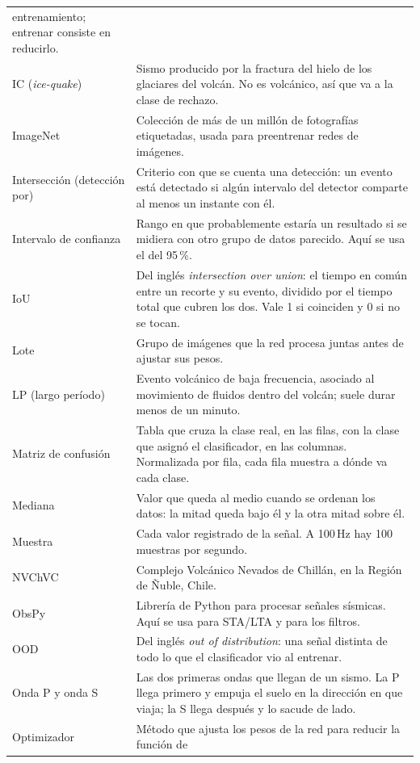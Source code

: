 {\begin{longtable}{>{\raggedright\arraybackslash}p{3.4cm}>{\raggedright\arraybackslash}p{9.4cm}}
entrenamiento; entrenar consiste en reducirlo. \\
IC (\emph{ice-quake}) & Sismo producido por la fractura del hielo de los
glaciares del volcán. No es volcánico, así que va a la clase de rechazo. \\
ImageNet & Colección de más de un millón de fotografías etiquetadas, usada para
preentrenar redes de imágenes. \\
Intersección (detección por) & Criterio con que se cuenta una detección: un
evento está detectado si algún intervalo del detector comparte al menos un
instante con él. \\
Intervalo de confianza & Rango en que probablemente estaría un resultado si se
midiera con otro grupo de datos parecido. Aquí se usa el del 95\,\%. \\
IoU & Del inglés \emph{intersection over union}: el tiempo en común entre un
recorte y su evento, dividido por el tiempo total que cubren los dos. Vale 1
si coinciden y 0 si no se tocan. \\
Lote & Grupo de imágenes que la red procesa juntas antes de ajustar sus
pesos. \\
LP (largo período) & Evento volcánico de baja frecuencia, asociado al
movimiento de fluidos dentro del volcán; suele durar menos de un minuto. \\
Matriz de confusión & Tabla que cruza la clase real, en las filas, con la
clase que asignó el clasificador, en las columnas. Normalizada por fila, cada
fila muestra a dónde va cada clase. \\
Mediana & Valor que queda al medio cuando se ordenan los datos: la mitad queda
bajo él y la otra mitad sobre él. \\
Muestra & Cada valor registrado de la señal. A 100\,Hz hay 100 muestras por
segundo. \\
NVChVC & Complejo Volcánico Nevados de Chillán, en la Región de Ñuble,
Chile. \\
ObsPy & Librería de Python para procesar señales sísmicas. Aquí se usa para
STA/LTA y para los filtros. \\
OOD & Del inglés \emph{out of distribution}: una señal distinta de todo lo que
el clasificador vio al entrenar. \\
Onda P y onda S & Las dos primeras ondas que llegan de un sismo. La P llega
primero y empuja el suelo en la dirección en que viaja; la S llega después y
lo sacude de lado. \\
Optimizador & Método que ajusta los pesos de la red para reducir la función de

\end{longtable}}
